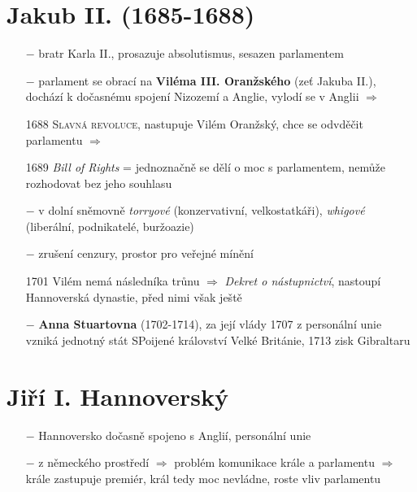 \documentclass{article}
\begin{document}
\section*{Jakub II. (1685-1688)}
\begin{itemize}
    \vspace{-0.5em}
    \setlength\itemsep{0.15em}
    \item[$-$] bratr Karla II., prosazuje absolutismus, sesazen parlamentem
    \item[$-$] parlament se obrací na \textbf{Viléma III. Oranžského} (zeť Jakuba II.), dochází k dočasnému spojení Nizozemí a Anglie, vylodí se v Anglii $\Rightarrow$
    \item[1688] \textsc{Slavná revoluce}, nastupuje Vilém Oranžský, chce se odvděčit parlamentu $\Rightarrow$
    \item[1689] \textit{Bill of Rights} = jednoznačně se dělí o moc s parlamentem, nemůže rozhodovat bez jeho souhlasu
    \item[$-$] v dolní sněmovně \textit{torryové} (konzervativní, velkostatkáři), \textit{whigové} (liberální, podnikatelé, buržoazie)
    \item[$-$] zrušení cenzury, prostor pro veřejné mínění
    \item[1701] Vilém nemá následníka trůnu $\Rightarrow$ \textit{Dekret o nástupnictví}, nastoupí Hannoverská dynastie, před nimi však ještě
    \item[$-$] \textbf{Anna Stuartovna} (1702-1714), za její vlády 1707 z personální unie vzniká jednotný stát SPoijené království Velké Británie, 1713 zisk Gibraltaru
\end{itemize}

\section*{Jiří I. Hannoverský}
\begin{itemize}
    \vspace{-0.5em}
    \setlength\itemsep{0.15em}
    \item[$-$] Hannoversko dočasně spojeno s Anglií, personální unie
    \item[$-$] z německého prostředí $\Rightarrow$ problém komunikace krále a parlamentu $\Rightarrow$ krále zastupuje premiér, král tedy moc nevládne, roste vliv parlamentu
\end{itemize}
\end{document}
